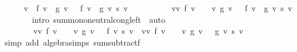 \begin{isabellebody}
\ \ \ \ \isamarkupfalse%
\ {\isachardoublequoteopen}{\isacharparenleft}{\kern0pt}{\isasymSum}v\ {\isacharbar}{\kern0pt}\ f\ v\ {\isacharminus}{\kern0pt}\ g\ v\ {\isasymnoteq}\ {}{\isachardot}{\kern0pt}\ {\isacharparenleft}{\kern0pt}f\ v\ {\isacharminus}{\kern0pt}\ g\ v{\isacharparenright}{\kern0pt}\ {\isacharasterisk}{\kern0pt}s\ v{\isacharparenright}{\kern0pt}\ {\isacharequal}{\kern0pt}\ \isanewline
\ \ \ \ \ \ \ \ {\isacharparenleft}{\kern0pt}{\isasymSum}v{\isasymin}{\isacharbraceleft}{\kern0pt}v{\isachardot}{\kern0pt}\ f\ v\ {\isasymnoteq}\ {}{\isacharbraceright}{\kern0pt}\ {\isasymunion}\ {\isacharbraceleft}{\kern0pt}v{\isachardot}{\kern0pt}\ g\ v\ {\isasymnoteq}\ {}{\isacharbraceright}{\kern0pt}{\isachardot}{\kern0pt}\ {\isacharparenleft}{\kern0pt}f\ v\ {\isacharminus}{\kern0pt}\ g\ v{\isacharparenright}{\kern0pt}\ {\isacharasterisk}{\kern0pt}s\ v{\isacharparenright}{\kern0pt}{\isachardoublequoteclose}\isanewline
\ \ \ \ \ \ \isamarkupfalse%
\ {\isacharparenleft}{\kern0pt}intro\ sum{\isachardot}{\kern0pt}mono{\isacharunderscore}{\kern0pt}neutral{\isacharunderscore}{\kern0pt}cong{\isacharunderscore}{\kern0pt}left\ {\isacharasterisk}{\kern0pt}{\isacharparenright}{\kern0pt}\ auto\isanewline
\ \ \ \ \isamarkupfalse%
\ \isamarkupfalse%
\ {\isachardoublequoteopen}{\isachardot}{\kern0pt}{\isachardot}{\kern0pt}{\isachardot}{\kern0pt}\ {\isacharequal}{\kern0pt}\isanewline
\ \ \ \ \ \ \ \ {\isacharparenleft}{\kern0pt}{\isasymSum}v{\isasymin}{\isacharbraceleft}{\kern0pt}v{\isachardot}{\kern0pt}\ f\ v\ {\isasymnoteq}\ {}{\isacharbraceright}{\kern0pt}\ {\isasymunion}\ {\isacharbraceleft}{\kern0pt}v{\isachardot}{\kern0pt}\ g\ v\ {\isasymnoteq}\ {}{\isacharbraceright}{\kern0pt}{\isachardot}{\kern0pt}\ f\ v\ {\isacharasterisk}{\kern0pt}s\ v{\isacharparenright}{\kern0pt}\ {\isacharminus}{\kern0pt}\ {\isacharparenleft}{\kern0pt}{\isasymSum}v{\isasymin}{\isacharbraceleft}{\kern0pt}v{\isachardot}{\kern0pt}\ f\ v\ {\isasymnoteq}\ {}{\isacharbraceright}{\kern0pt}\ {\isasymunion}\ {\isacharbraceleft}{\kern0pt}v{\isachardot}{\kern0pt}\ g\ v\ {\isasymnoteq}\ {}{\isacharbraceright}{\kern0pt}{\isachardot}{\kern0pt}\ g\ v\ {\isacharasterisk}{\kern0pt}s\ v{\isacharparenright}{\kern0pt}{\isachardoublequoteclose}\isanewline
\ \ \ \ \ \ \isamarkupfalse%
\ {\isacharparenleft}{\kern0pt}simp\ add{\isacharcolon}{\kern0pt}\ algebra{\isacharunderscore}{\kern0pt}simps\ sum{\isacharunderscore}{\kern0pt}subtractf{\isacharparenright}{\kern0pt}\isanewline

\end{isabellebody}
